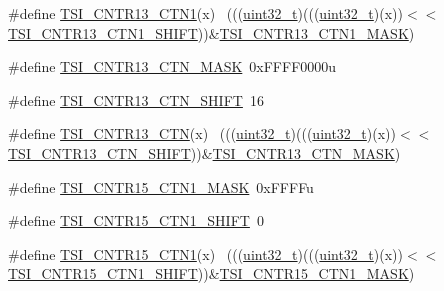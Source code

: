 \begin{DoxyCompactItemize}
\item 
\#define \hyperlink{group___t_s_i___register___masks_ga303046b18a5643a3d2c41c7285e0efa7}{T\+S\+I\+\_\+\+C\+N\+T\+R13\+\_\+\+C\+T\+N1}(x)                                          ~(((\hyperlink{_p_e___types_8h_a33594304e786b158f3fb30289278f5af}{uint32\+\_\+t})(((\hyperlink{_p_e___types_8h_a33594304e786b158f3fb30289278f5af}{uint32\+\_\+t})(x))$<$$<$\hyperlink{group___t_s_i___register___masks_gad19e50775ced3a5322d93b67c6019536}{T\+S\+I\+\_\+\+C\+N\+T\+R13\+\_\+\+C\+T\+N1\+\_\+\+S\+H\+I\+FT}))\&\hyperlink{group___t_s_i___register___masks_ga9671deb8a78c5ef99068b0244f19f125}{T\+S\+I\+\_\+\+C\+N\+T\+R13\+\_\+\+C\+T\+N1\+\_\+\+M\+A\+SK})
\item 
\#define \hyperlink{group___t_s_i___register___masks_gac4b6ed4489dd39029223b49be774965a}{T\+S\+I\+\_\+\+C\+N\+T\+R13\+\_\+\+C\+T\+N\+\_\+\+M\+A\+SK}~0x\+F\+F\+F\+F0000u
\item 
\#define \hyperlink{group___t_s_i___register___masks_gaffd92baf7411ffdc73289bcf96764e3a}{T\+S\+I\+\_\+\+C\+N\+T\+R13\+\_\+\+C\+T\+N\+\_\+\+S\+H\+I\+FT}~16
\item 
\#define \hyperlink{group___t_s_i___register___masks_ga2501cf6e6a26ae480b270ae90da03716}{T\+S\+I\+\_\+\+C\+N\+T\+R13\+\_\+\+C\+TN}(x)                                            ~(((\hyperlink{_p_e___types_8h_a33594304e786b158f3fb30289278f5af}{uint32\+\_\+t})(((\hyperlink{_p_e___types_8h_a33594304e786b158f3fb30289278f5af}{uint32\+\_\+t})(x))$<$$<$\hyperlink{group___t_s_i___register___masks_gaffd92baf7411ffdc73289bcf96764e3a}{T\+S\+I\+\_\+\+C\+N\+T\+R13\+\_\+\+C\+T\+N\+\_\+\+S\+H\+I\+FT}))\&\hyperlink{group___t_s_i___register___masks_gac4b6ed4489dd39029223b49be774965a}{T\+S\+I\+\_\+\+C\+N\+T\+R13\+\_\+\+C\+T\+N\+\_\+\+M\+A\+SK})
\item 
\#define \hyperlink{group___t_s_i___register___masks_gaa249fbc86511094b5b4ea1cfdff064d1}{T\+S\+I\+\_\+\+C\+N\+T\+R15\+\_\+\+C\+T\+N1\+\_\+\+M\+A\+SK}~0x\+F\+F\+F\+Fu
\item 
\#define \hyperlink{group___t_s_i___register___masks_ga7938e4586802c6fa57e4d0145b36aa70}{T\+S\+I\+\_\+\+C\+N\+T\+R15\+\_\+\+C\+T\+N1\+\_\+\+S\+H\+I\+FT}~0
\item 
\#define \hyperlink{group___t_s_i___register___masks_ga9ec01214a1e4b6c4f0d7fe19718a32e1}{T\+S\+I\+\_\+\+C\+N\+T\+R15\+\_\+\+C\+T\+N1}(x)                                          ~(((\hyperlink{_p_e___types_8h_a33594304e786b158f3fb30289278f5af}{uint32\+\_\+t})(((\hyperlink{_p_e___types_8h_a33594304e786b158f3fb30289278f5af}{uint32\+\_\+t})(x))$<$$<$\hyperlink{group___t_s_i___register___masks_ga7938e4586802c6fa57e4d0145b36aa70}{T\+S\+I\+\_\+\+C\+N\+T\+R15\+\_\+\+C\+T\+N1\+\_\+\+S\+H\+I\+FT}))\&\hyperlink{group___t_s_i___register___masks_gaa249fbc86511094b5b4ea1cfdff064d1}{T\+S\+I\+\_\+\+C\+N\+T\+R15\+\_\+\+C\+T\+N1\+\_\+\+M\+A\+SK})
$$
\end{DoxyCompactItemize}
